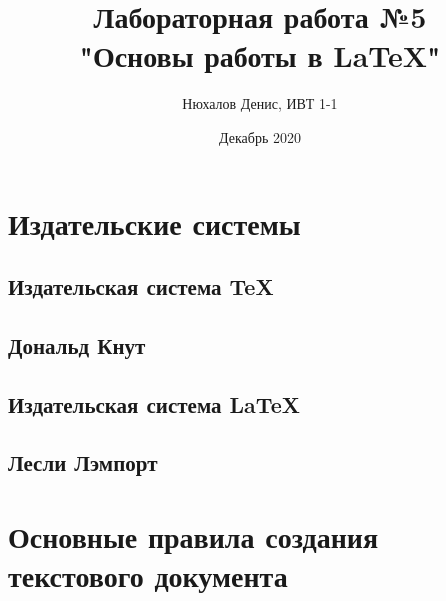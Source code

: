 \documentclass{article}
\title{Лабораторная работа №5\\ "Основы работы в \LaTeX"}
\author{Нюхалов Денис, ИВТ 1-1}
\date{Декабрь 2020}
\begin{document}
\maketitle

\section{Издательские системы}
\subsection{Издательская система TeX}
\subsection{Дональд Кнут}
\subsection{Издательская система LaTeX}
\subsection{Лесли Лэмпорт}
\section{Основные правила создания текстового документа}
\end{document}
